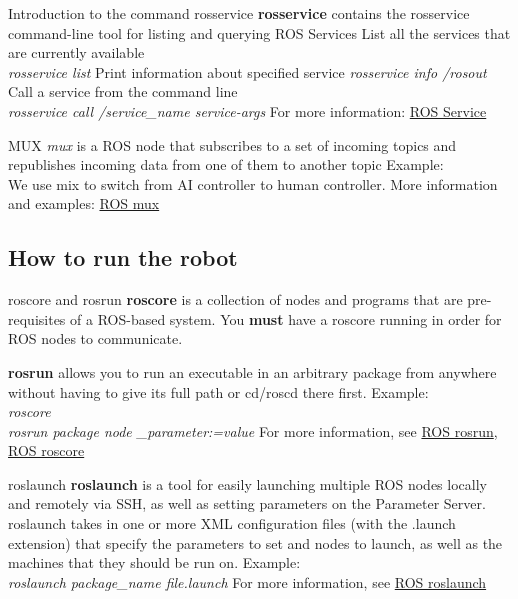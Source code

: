 \documentclass{beamer}
\begin{document}
\begin{frame}{Introduction to the command rosservice}
\textbf{rosservice} contains the rosservice command-line tool for listing and querying ROS Services
\vfill
List all the services that are currently available\\
\textit{rosservice list}
\vfill
Print information about specified service
\textit{rosservice info /rosout}
\vfill
Call a service from the command line\\
\textit{rosservice call /service\_name service-args}
\vfill
For more information: \href{http://wiki.ros.org/rosservice}{ROS Service}
\end{frame}

\begin{frame}{MUX}
\textit{mux} is a ROS node that subscribes to a set of incoming topics and republishes incoming data from one of them to another topic
\vfill
Example:\\
We use mix to switch from AI controller to human controller.
\vfill
More information and examples: \href{http://wiki.ros.org/topic_tools/mux}{ROS mux}
\end{frame}

\subsection{How to run the robot}
\begin{frame}{roscore and rosrun}
\textbf{roscore} is a collection of nodes and programs that are pre-requisites of a ROS-based system. You \textbf{must} have a roscore running in order for ROS nodes to communicate.

\vfill

\textbf{rosrun} allows you to run an executable in an arbitrary package from anywhere without having to give its full path or cd/roscd there first.
\vfill
Example:\\
\textit{roscore}\\
\textit{rosrun package node \_parameter:=value}
\vfill
For more information, see \href{https://wiki.ros.org/rosbash\#rosrun}{ROS rosrun}, \href{https://wiki.ros.org/roscore}{ROS roscore}
\end{frame}

\begin{frame}{roslaunch}
\textbf{roslaunch} is a tool for easily launching multiple ROS nodes locally and remotely via SSH, as well as setting parameters on the Parameter Server.
\vfill
roslaunch takes in one or more XML configuration files (with the .launch extension) that specify the parameters to set and nodes to launch, as well as the machines that they should be run on.
\vfill
Example:\\
\textit{roslaunch package\_name file.launch}
\vfill
For more information, see \href{https://wiki.ros.org/roslaunch}{ROS roslaunch}
\end{frame}
\end{document}

